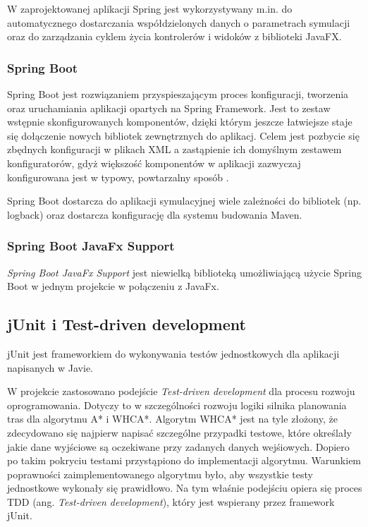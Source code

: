 W zaprojektowanej aplikacji Spring jest wykorzystywany m.in. do automatycznego dostarczania współdzielonych danych o parametrach symulacji oraz do zarządzania cyklem życia kontrolerów i widoków z biblioteki JavaFX.

\subsubsection{Spring Boot}
Spring Boot jest rozwiązaniem przyspieszającym proces konfiguracji, tworzenia oraz uruchamiania aplikacji opartych na Spring Framework.
Jest to zestaw wstępnie skonfigurowanych komponentów, dzięki którym jeszcze łatwiejsze staje się dołączenie nowych bibliotek zewnętrznych do aplikacj. Celem jest pozbycie się zbędnych konfiguracji w plikach XML a zastąpienie ich domyślnym zestawem konfiguratorów, gdyż większość komponentów w aplikacji zazwyczaj konfigurowana jest w typowy, powtarzalny sposób \cite{docs-springboot}.

Spring Boot dostarcza do aplikacji symulacyjnej wiele zależności do bibliotek (np. logback) oraz dostarcza konfigurację dla systemu budowania Maven.
\subsubsection{Spring Boot JavaFx Support}
{\it Spring Boot JavaFx Support} jest niewielką biblioteką umożliwiającą użycie Spring Boot w jednym projekcie w połączeniu z JavaFx.

\subsection{jUnit i Test-driven development}
jUnit jest frameworkiem do wykonywania testów jednostkowych dla aplikacji napisanych w Javie.

W projekcie zastosowano podejście {\it Test-driven development} dla procesu rozwoju oprogramowania. Dotyczy to w szczególności rozwoju logiki silnika planowania tras dla algorytmu A* i WHCA*. Algorytm WHCA* jest na tyle złożony, że zdecydowano się najpierw napisać szczególne przypadki testowe, które określały jakie dane wyjściowe są oczekiwane przy zadanych danych wejśiowych. Dopiero po takim pokryciu testami przystąpiono do implementacji algorytmu. Warunkiem poprawności zaimplementowanego algorytmu było, aby wszystkie testy jednostkowe wykonały się prawidłowo. Na tym właśnie podejściu opiera się proces TDD (ang. {\it Test-driven development}), który jest wspierany przez framework jUnit.

